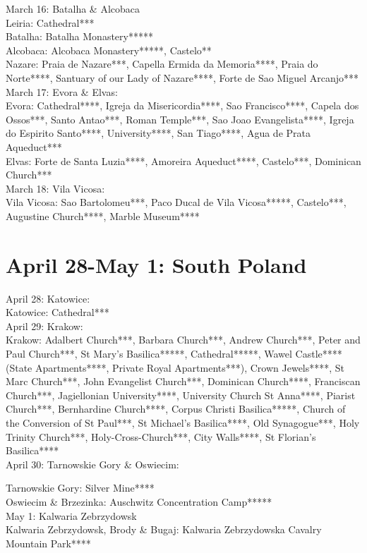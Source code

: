 March 16: Batalha \& Alcobaca\\

Leiria: Cathedral***\\
Batalha: Batalha Monastery*****\\
Alcobaca: Alcobaca Monastery*****, Castelo**\\
Nazare: Praia de Nazare***, Capella Ermida da Memoria****, Praia do Norte****, Santuary of our Lady of Nazare****, Forte de Sao Miguel Arcanjo***\\

March 17: Evora \& Elvas:\\

Evora: Cathedral****, Igreja da Misericordia****, Sao Francisco****, Capela dos Ossos***, Santo Antao***, Roman Temple***, Sao Joao Evangelista****, Igreja do Espirito Santo****, University****, San Tiago****, Agua de Prata Aqueduct***\\
Elvas: Forte de Santa Luzia****, Amoreira Aqueduct****, Castelo***, Dominican Church***\\

March 18: Vila Vicosa:\\

Vila Vicosa: Sao Bartolomeu***, Paco Ducal de Vila Vicosa*****, Castelo***, Augustine Church****, Marble Museum****\\

\section{April 28-May 1: South Poland}
\label{2023:SouthPolands}

April 28: Katowice:\\

Katowice: Cathedral***\\

April 29: Krakow:\\

Krakow: Adalbert Church***, Barbara Church***, Andrew Church***, Peter and Paul Church***, St Mary's Basilica*****, Cathedral*****, Wawel Castle**** (State Apartments****, Private Royal Apartments***), Crown Jewels****, St Marc Church***,
John Evangelist Church***, Dominican Church****, Franciscan Church***, Jagiellonian University****, University Church St Anna****, Piarist Church***, Bernhardine Church****, Corpus Christi Basilica*****, Church of the Conversion of St Paul***,
St Michael's Basilica****, Old Synagogue***, Holy Trinity Church***, Holy-Cross-Church***, City Walls****, St Florian's Basilica****\\

April 30: Tarnowskie Gory \& Oswiecim:

Tarnowskie Gory: Silver Mine****\\

Oswiecim \& Brzezinka:  Auschwitz Concentration Camp*****\\

May 1: Kalwaria Zebrzydowsk\\

Kalwaria Zebrzydowsk, Brody \& Bugaj: Kalwaria Zebrzydowska Cavalry Mountain Park****\\



